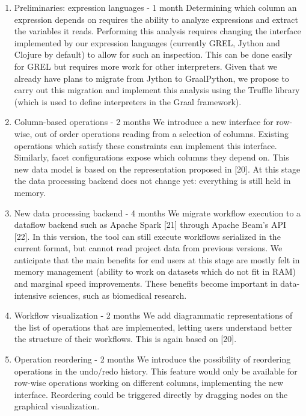 \documentclass[]{elsarticle} %
\providecommand{\tightlist}{%
  \setlength{\itemsep}{0pt}\setlength{\parskip}{0pt}}
\begin{document}
\begin{enumerate}
\def\labelenumi{\arabic{enumi}.}
\tightlist
\item
  Preliminaries: expression languages - 1 month
  Determining which column an expression depends on requires the ability to analyze expressions and extract the variables it reads.
  Performing this analysis requires changing the interface implemented
  by our expression languages (currently GREL, Jython and Clojure by
  default) to allow for such an inspection. This can be done easily for
  GREL but requires more work for other interpreters. Given that we
  already have plans to migrate from Jython to GraalPython, we propose to carry out this migration and implement this analysis using the
  Truffle library (which is used to define interpreters in the Graal framework).
\item
  Column-based operations - 2 months
  We introduce a new interface for row-wise, out of order operations
  reading from a selection of columns. Existing operations which satisfy
  these constraints can implement this interface. Similarly, facet configurations expose which columns they depend on. This new data model
  is based on the representation proposed in {[}20{]}. At this stage the data
  processing backend does not change yet: everything is still held in
  memory.
\item
  New data processing backend - 4 months
  We migrate workflow execution to a dataflow backend such as Apache
  Spark {[}21{]} through Apache Beam's API {[}22{]}. In this version, the tool
  can still execute workflows serialized in the current format, but cannot
  read project data from previous versions.
  We anticipate that the main benefits for end users at this stage are
  mostly felt in memory management (ability to work on datasets which
  do not fit in RAM) and marginal speed improvements. These benefits become important in data-intensive sciences, such as biomedical
  research.
\item
  Workflow visualization - 2 months
  We add diagrammatic representations of the list of operations that
  are implemented, letting users understand better the structure of their
  workflows. This is again based on {[}20{]}.
\item
  Operation reordering - 2 months
  We introduce the possibility of reordering operations in the undo/redo
  history. This feature would only be available for row-wise operations
  working on different columns, implementing the new interface. Reordering could be triggered directly by dragging nodes on the graphical visualization.

\end{enumerate}
\end{document}
